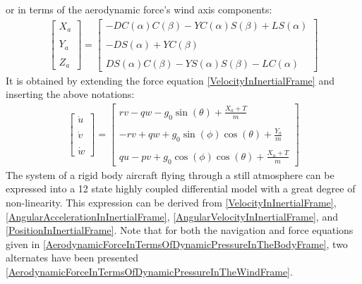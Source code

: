 \documentclass[twocolumn,showpacs,
    nofootinbib,aps,superscriptaddress,
    eqsecnum,prd,showkeys,10pt,floatfix]{revtex4}
\begin{document}
or in terms of the aerodynamic force's wind axis components:
\begin{align}
    \begin{bmatrix}
        X_a \\\\
        Y_a \\\\
        Z_a
    \end{bmatrix}=
    \begin{bmatrix}
        -D{C(\alpha)}{C(\beta)}-Y{C(\alpha)}{S(\beta)}+L{S(\alpha)} \\\\
        -D{S(\alpha)}+Y{C(\beta)}                                   \\\\
        D{S(\alpha)}{C(\beta)}-Y{S(\alpha)}{S(\beta)}-L{C(\alpha)}
    \end{bmatrix}
    \label{AerodynamicBodyCoefficientsDefinedInTermsOfAerodynamicForces}
\end{align}
It is obtained by extending the force equation {\ref{VelocityInInertialFrame}} and inserting the above notations:
\begin{align}
    \begin{bmatrix}
        \dot{u} \\\\
        \dot{v} \\\\
        \dot{w}
    \end{bmatrix}=
    \begin{bmatrix}
        rv-qw-g_0\sin(\theta)+\frac{X_a+T}{m}          \\\\
        -rv+qw+g_0\sin(\phi)\cos(\theta)+\frac{Y_a}{m} \\\\
        qu-pv+g_0\cos(\phi)\cos(\theta)+\frac{X_a+T}{m}
    \end{bmatrix}
    \label{AccelerationInInertialFrameDiffEquation}
\end{align}
The system of a rigid body aircraft flying through a still atmosphere can be expressed into a 12 state highly coupled differential model with a great degree of non-linearity. This expression can be derived from {\ref{VelocityInInertialFrame}}, {\ref{AngularAccelerationInInertialFrame}}, {\ref{AngularVelocityInInertialFrame}}, and {\ref{PositionInInertialFrame}}.
Note that for both the navigation and force equations given in  {\ref{AerodynamicForceInTermsOfDynamicPressureInTheBodyFrame}}, two alternates have been presented {\ref{AerodynamicForceInTermsOfDynamicPressureInTheWindFrame}}.
\end{document}

